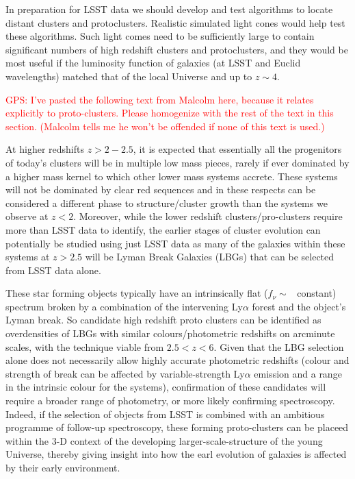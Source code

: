 \documentclass[a4paper,11pt]{article}
\newcommand{\red}{\textcolor{red}}
\begin{document}
In preparation for LSST data we should develop and test algorithms to
locate distant clusters and protoclusters. Realistic simulated light
cones would help test these algorithms. Such light comes need to be
sufficiently large to contain significant numbers of high redshift
clusters and protoclusters, and they would be most useful if the
luminosity function of galaxies (at LSST and Euclid wavelengths)
matched that of the local Universe and up to $z\sim4$.

\noindent\red{GPS: I've pasted the following text from Malcolm here,
  because it relates explicitly to proto-clusters.  Please homogenize
  with the rest of the text in this section.  (Malcolm tells me he
  won't be offended if none of this text is used.)}

At higher redshifts $z>2-2.5$, it is expected that essentially all the
progenitors of today's clusters will be in multiple low mass pieces,
rarely if ever dominated by a higher mass kernel to which other lower
mass systems accrete.  These systems will not be dominated by clear
red sequences and in these respects can be considered a different
phase to structure/cluster growth than the systems we observe at
$z<2$.  Moreover, while the lower redshift clusters/pro-clusters
require more than LSST data to identify, the earlier stages of cluster
evolution can potentially be studied using just LSST data as many of
the galaxies within these systems at $z>2.5$ will be Lyman Break
Galaxies (LBGs) that can be selected from LSST data alone.

These star forming objects typically have an intrinsically flat
($f_\nu \sim $~ constant) spectrum broken by a combination of the
intervening Ly$\alpha$ forest and the object's Lyman break.  So
candidate high redshift proto clusters can be identified as
overdensities of LBGs with similar colours/photometric redshifts on
arcminute scales, with the technique viable from $2.5<z<6$. Given that
the LBG selection alone does not necessarily allow highly accurate
photometric redshifts (colour and strength of break can be affected by
variable-strength Ly$\alpha$ emission and a range in the intrinsic
colour for the systems), confirmation of these candidates will require
a broader range of photometry, or more likely confirming spectroscopy.
Indeed, if the selection of objects from LSST is combined with an
ambitious programme of follow-up spectroscopy, these forming
proto-clusters can be placeed within the 3-D context of the developing
larger-scale-structure of the young Universe, thereby giving insight
into how the earl evolution of galaxies is affected by their early
environment.
\end{document}
